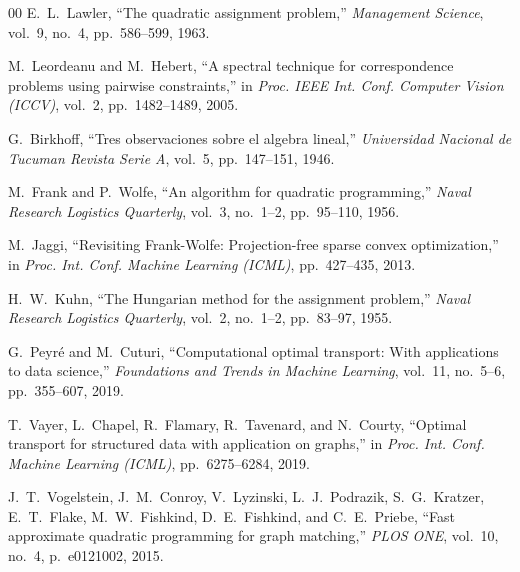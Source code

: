 \documentclass[conference]{IEEEtran}
\begin{document}
\begin{thebibliography}{00}
E.~L.~Lawler,
``The quadratic assignment problem,''
\textit{Management Science},
vol.~9, no.~4, pp.~586--599, 1963.

M.~Leordeanu and M.~Hebert,
``A spectral technique for correspondence problems using pairwise constraints,''
in \textit{Proc. IEEE Int. Conf. Computer Vision (ICCV)},
vol.~2, pp.~1482--1489, 2005.

G.~Birkhoff,
``Tres observaciones sobre el algebra lineal,''
\textit{Universidad Nacional de Tucuman Revista Serie A},
vol.~5, pp.~147--151, 1946.

M.~Frank and P.~Wolfe,
``An algorithm for quadratic programming,''
\textit{Naval Research Logistics Quarterly},
vol.~3, no.~1--2, pp.~95--110, 1956.

M.~Jaggi,
``Revisiting Frank-Wolfe: Projection-free sparse convex optimization,''
in \textit{Proc. Int. Conf. Machine Learning (ICML)},
pp.~427--435, 2013.

H.~W.~Kuhn,
``The Hungarian method for the assignment problem,''
\textit{Naval Research Logistics Quarterly},
vol.~2, no.~1--2, pp.~83--97, 1955.

G.~Peyr{\'e} and M.~Cuturi,
``Computational optimal transport: With applications to data science,''
\textit{Foundations and Trends in Machine Learning},
vol.~11, no.~5--6, pp.~355--607, 2019.

T.~Vayer, L.~Chapel, R.~Flamary, R.~Tavenard, and N.~Courty,
``Optimal transport for structured data with application on graphs,''
in \textit{Proc. Int. Conf. Machine Learning (ICML)},
pp.~6275--6284, 2019.

J.~T.~Vogelstein, J.~M.~Conroy, V.~Lyzinski, L.~J.~Podrazik, S.~G.~Kratzer, E.~T.~Flake, M.~W.~Fishkind, D.~E.~Fishkind, and C.~E.~Priebe,
``Fast approximate quadratic programming for graph matching,''
\textit{PLOS ONE},
vol.~10, no.~4, p.~e0121002, 2015.


\end{thebibliography}
\end{document}
